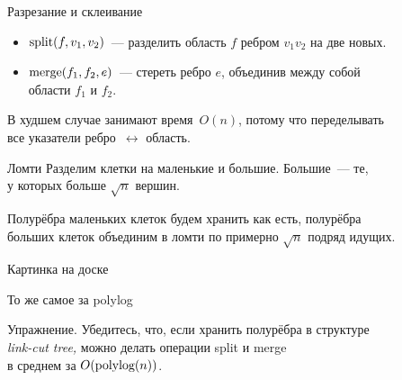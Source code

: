 \begin{frame}{Разрезание и склеивание}
\begin{itemize}
	\item \(\operatorname{split} (f,v_1,v_2)\)~— разделить область \(f\) ребром \(v_1v_2\) на две новых.
	\item \(\operatorname{merge} (f_1,f_2,e)\)~— стереть ребро \(e\), объединив между собой \\
	   области \(f_1\) и \(f_2\).
\end{itemize}
\begin{center}  \end{center} \vspace{-3mm}

	В худшем случае занимают время~\(O(n)\), потому что переделывать \\
	все указатели ребро~\(\leftrightarrow\) область.
\end{frame}

\begin{frame}{Ломти}
	Разделим клетки на \alert{маленькие} и \alert{большие}. Большие~— те,\\
	у которых больше \(\sqrt{n}\) вершин.

	Полурёбра маленьких клеток будем хранить как есть, полурёбра\\
	больших клеток объединим в \alert{ломти} по примерно \(\sqrt{n}\) подряд идущих. \bigskip

	{\footnotesize \textcolor{white!46!dgray}{Картинка на доске}}
\end{frame}

\begin{frame}{То же самое за polylog}
\begin{block}{Упражнение.}
	Убедитесь, что, если хранить полурёбра в структуре\\
	{\it link-cut tree,} можно делать операции split и merge\\
	в среднем за \(O\lr*{\text{polylog}\lr*{n}}\).
\end{block}
\end{frame}
